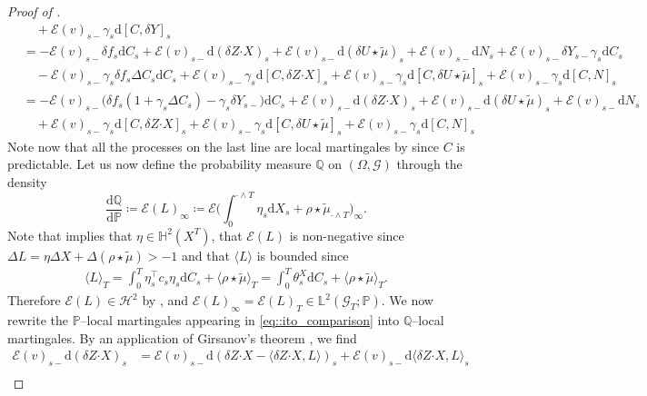 \documentclass[10pt]{article} %
\newcommand\cE{\mathcal E}
\newcommand\cG{\mathcal G}
\newcommand\cH{\mathcal H}
\def \H{\mathbb{H}}
\def \L{\mathbb{L}}
\def \P{\mathbb{P}}
\def \Q{\mathbb{Q}}
\newcommand{\bcdot}{\boldsymbol{\cdot}}
\def\d{\mathrm{d}}
\begin{document}
\begin{proof}[Proof of ]
\begin{align}
		&\quad + \cE(v)_{s-}\gamma_s\d [C,\delta Y]_s \nonumber\\
		&= -\cE(v)_{s-} \delta f_s \d C_s + \cE(v)_{s-} \d(\delta Z \bcdot X)_s + \cE(v)_{s-}\d (\delta U \star\tilde\mu)_s + \cE(v)_{s-}\d N_s + \cE(v)_{s-}\delta Y_{s-}\gamma_s\d C_s \nonumber\\
		&\quad - \cE(v)_{s-}\gamma_s\delta f_s \Delta C_s \d C_s + \cE(v)_{s-}\gamma_s \d [C,\delta Z \bcdot X]_s + \cE(v)_{s-}\gamma_s \d [C,\delta U \star\tilde\mu]_s + \cE(v)_{s-}\gamma_s \d [C,N]_s \nonumber\\
		&= - \cE(v)_{s-} \big(\delta f_s(1+\gamma_s\Delta C_s) - \gamma_s\delta Y_{s-}\big)\d C_s + \cE(v)_{s-} \d(\delta Z \bcdot X)_s + \cE(v)_{s-}\d (\delta U \star\tilde\mu)_s + \cE(v)_{s-}\d N_s \nonumber\\
		&\quad + \cE(v)_{s-}\gamma_s \d [C,\delta Z \bcdot X]_s + \cE(v)_{s-}\gamma_s \d [C,\delta U \star\tilde\mu]_s + \cE(v)_{s-}\gamma_s \d [C,N]_s
	\end{align}
	Note now that all the processes on the last line are local martingales by \cite[Proposition I.4.49.(c)]{jacod2003limit} since $C$ is predictable. Let us now define the probability measure $\Q$ on $(\Omega,\cG)$ through the density
	\begin{equation}\label{eq::stoch_exp_measure_change}
		\frac{\d\Q}{\d\P} \coloneqq \cE(L)_\infty \coloneqq \cE\bigg(\int_0^{\cdot \land T}\eta_s\d X_s + \rho \star \tilde\mu_{\cdot \land T}\bigg)_\infty.
	\end{equation}
	Note that  implies that $\eta \in \H^2(X^T)$, that $\cE(L)$ is non-negative since $\Delta L = \eta \Delta X + \Delta (\rho\star\tilde\mu) > -1$ and that $\langle L \rangle$ is bounded since
	\begin{align*}
		\langle L \rangle_T = \int_0^T \eta^\top_s c_s \eta_s \d C_s + \langle \rho\star\tilde\mu\rangle_T = \int_0^T \theta^X_s \d C_s + \langle \rho\star\tilde\mu\rangle_T.
	\end{align*}
	Therefore $\cE(L) \in \cH^2$ by , and $\cE(L)_\infty = \cE(L)_T \in \L^2(\cG_T;\P)$. We now rewrite the $\P$--local martingales appearing in \eqref{eq::ito_comparison} into $\Q$--local martingales. By an application of Girsanov's theorem \cite[Proposition 7.25 and 7.26]{jacod1979calcul}, we find
	\begingroup
	\allowdisplaybreaks
	\begin{align*}
		\cE(v)_{s-} \d (\delta Z \bcdot X)_s 
		&= \cE(v)_{s-}\d (\delta Z\bcdot X - \langle \delta Z \bcdot X,L \rangle)_s + \cE(v)_{s-}\d\langle \delta Z \bcdot X,L \rangle_s \\

\end{align*}
\end{proof}
\end{document}
